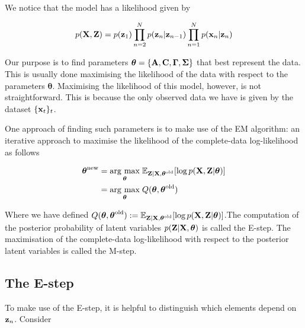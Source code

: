 \documentclass[11pt]{article}
\newcommand{\argmax}[1]{\underset{#1}{\operatorname{arg}\,\operatorname{max}}\;}
\begin{document}
We notice that the model has a likelihood given by

\begin{equation}
	p({\bf X}, {\bf Z}) = p({\bf z}_1)\prod_{n=2}^N p({\bf z}_n\vert {\bf z}_{n-1})\prod_{n=1}^N p({\bf x}_n\vert {\bf z}_n)
\end{equation}

Our purpose is to find parameters $\boldsymbol\theta = \{{\bf A}, {\bf C}, \boldsymbol\Gamma, \boldsymbol\Sigma\}$ that best represent the data. This is usually done maximising the likelihood of the data with respect to the parameters $\boldsymbol{\theta}$. Maximising the likelihood of this model, however, is not straightforward. This is because the only observed data we have is given by the dataset $\{{\bf x}_t\}_t$. 


One approach of finding such parameters is to make use of the EM algorithm: an iterative approach to maximise the likelihood of the complete-data log-likelihood as follows

\begin{align}
	\boldsymbol{\theta}^\text{new} &= \argmax{\boldsymbol{\theta}} \mathbb{E}_{{\bf Z}\vert {\bf X}, \boldsymbol{\theta}^\text{old}}[\log p({\bf X}, {\bf Z}\vert \boldsymbol\theta)]\\
	&= \argmax{\boldsymbol{\theta}} Q(\boldsymbol\theta, \boldsymbol\theta^\text{old})
\end{align}

Where we have defined $Q(\boldsymbol\theta, \boldsymbol\theta^\text{old}) := \mathbb{E}_{{\bf Z}\vert {\bf X}, \boldsymbol{\theta}^\text{old}}[\log p({\bf X}, {\bf Z}\vert \boldsymbol\theta)]$.The computation of the posterior probability of latent variables $p({\bf Z}\vert {\bf X}, \boldsymbol\theta)$ is called the E-step. The maximisation of the complete-data log-likelihood with respect to the posterior latent variables is called the M-step.


\subsection{The E-step}
To make use of the E-step, it is helpful to distinguish which elements depend on ${\bf z}_n$. Consider
\end{document}
